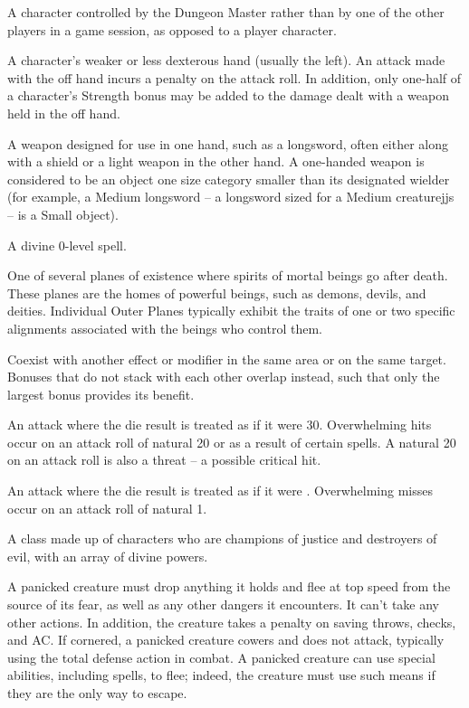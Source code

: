  A character controlled by the 
Dungeon Master rather than by one of the other players in a game 
session, as opposed to a player character. 

 A character's weaker or less dexterous hand (usually 
the left). An attack made with the off hand incurs a  penalty on 
the attack roll. In addition, only one-half of a character's Strength 
bonus may be added to the damage dealt with a weapon held in the 
off hand.

 A weapon designed for use in one hand, 
such as a longsword, often either along with a shield or a light 
weapon in the other hand. A one-handed weapon is considered to be 
an object one size category smaller than its designated wielder (for 
example, a Medium longsword -- a longsword sized for a Medium creaturejjs --  is a Small object). 

 A divine 0-level spell. 

 One of several planes of existence where spirits of 
mortal beings go after death. These planes are the homes of 
powerful beings, such as demons, devils, and deities. Individual 
Outer Planes typically exhibit the traits of one or two specific 
alignments associated with the beings who control them. 

 Coexist with another effect or modifier in the same area 
or on the same target. Bonuses that do not stack with each other 
overlap instead, such that only the largest bonus provides its benefit. 

  An attack where the die result is treated as if it were 30. Overwhelming  hits occur on an attack roll of natural 20 or as a result of 
certain spells. A natural 20 on an attack roll is also a threat -- a possible 
critical hit. 

  An attack where the die result is treated as if it were .
Overwhelming  misses occur on an attack roll of natural 1. 

 A class made up of characters who are champions 
of justice and destroyers of evil, with an array of divine powers. 

 A panicked creature must drop anything it holds and 
flee at top speed from the source of its fear, as well as any other 
dangers it encounters. It can't take any other 
actions. In addition, the creature takes a  penalty on saving 
throws, checks, and AC. If cornered, a panicked 
creature cowers and does not attack, typically using the total defense 
action in combat. A panicked creature can use special abilities, 
including spells, to flee; indeed, the creature must use such means if 
they are the only way to escape. 

